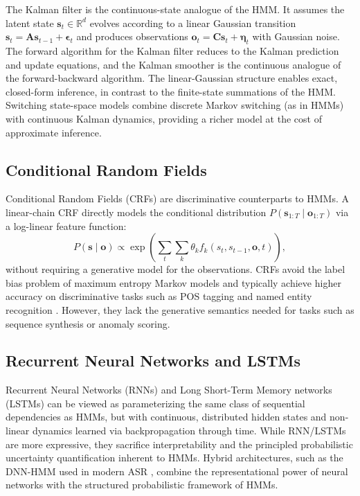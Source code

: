 \documentclass[conference]{IEEEtran}
\begin{document}
The Kalman filter \cite{kalman1960new} is the continuous-state analogue of the HMM. It assumes the latent state $\mathbf{s}_t \in \mathbb{R}^d$ evolves according to a linear Gaussian transition $\mathbf{s}_t = \mathbf{A}\mathbf{s}_{t-1} + \boldsymbol{\epsilon}_t$ and produces observations $\mathbf{o}_t = \mathbf{C}\mathbf{s}_t + \boldsymbol{\eta}_t$ with Gaussian noise. The forward algorithm for the Kalman filter reduces to the Kalman prediction and update equations, and the Kalman smoother is the continuous analogue of the forward-backward algorithm. The linear-Gaussian structure enables exact, closed-form inference, in contrast to the finite-state summations of the HMM. Switching state-space models \cite{kim1994dynamic} combine discrete Markov switching (as in HMMs) with continuous Kalman dynamics, providing a richer model at the cost of approximate inference.

\subsection{Conditional Random Fields}

Conditional Random Fields (CRFs) \cite{lafferty2001conditional} are discriminative counterparts to HMMs. A linear-chain CRF directly models the conditional distribution $P(\mathbf{s}_{1:T} \mid \mathbf{o}_{1:T})$ via a log-linear feature function:
\begin{equation}
P(\mathbf{s} \mid \mathbf{o}) \propto \exp\left(\sum_{t} \sum_{k} \theta_k f_k(s_t, s_{t-1}, \mathbf{o}, t)\right),
\end{equation}
without requiring a generative model for the observations. CRFs avoid the label bias problem of maximum entropy Markov models and typically achieve higher accuracy on discriminative tasks such as POS tagging and named entity recognition \cite{lafferty2001conditional}. However, they lack the generative semantics needed for tasks such as sequence synthesis or anomaly scoring.

\subsection{Recurrent Neural Networks and LSTMs}

Recurrent Neural Networks (RNNs) and Long Short-Term Memory networks (LSTMs) \cite{hochreiter1997long} can be viewed as parameterizing the same class of sequential dependencies as HMMs, but with continuous, distributed hidden states and non-linear dynamics learned via backpropagation through time. While RNN/LSTMs are more expressive, they sacrifice interpretability and the principled probabilistic uncertainty quantification inherent to HMMs. Hybrid architectures, such as the DNN-HMM used in modern ASR \cite{graves2006connectionist}, combine the representational power of neural networks with the structured probabilistic framework of HMMs.
\end{document}
